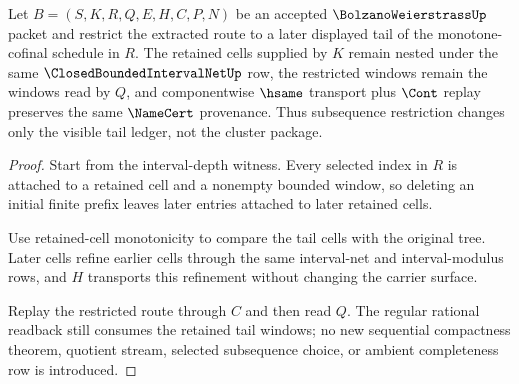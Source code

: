 \begin{theorem}
\label{thm:bolzano-weierstrass-tail-cell-stability}
Let $B=(S,K,R,Q,E,H,C,P,N)$ be an accepted $\BolzanoWeierstrassUp$ packet and restrict the extracted route to a later displayed tail of the monotone-cofinal schedule in $R$. The retained cells supplied by $K$ remain nested under the same $\ClosedBoundedIntervalNetUp$ row, the restricted windows remain the windows read by $Q$, and componentwise $\hsame$ transport plus $\Cont$ replay preserves the same $\NameCert$ provenance. Thus subsequence restriction changes only the visible tail ledger, not the cluster package.
\end{theorem}
\begin{proof}
Start from the interval-depth witness. Every selected index in $R$ is attached to a retained cell and a nonempty bounded window, so deleting an initial finite prefix leaves later entries attached to later retained cells.

Use retained-cell monotonicity to compare the tail cells with the original tree. Later cells refine earlier cells through the same interval-net and interval-modulus rows, and $H$ transports this refinement without changing the carrier surface.

Replay the restricted route through $C$ and then read $Q$. The regular rational readback still consumes the retained tail windows; no new sequential compactness theorem, quotient stream, selected subsequence choice, or ambient completeness row is introduced.
\end{proof}

